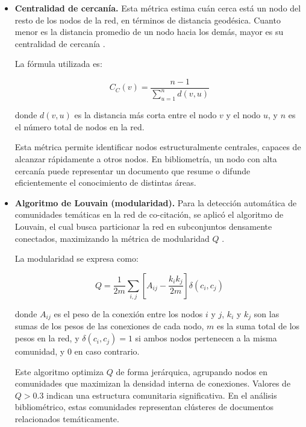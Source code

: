 \documentclass[twoside, twocolumn]{article}
\newcommand{\1}{\mathds{1}}						%
\begin{document}
\begin{enumerate}
\begin{itemize}
    donde $\sigma_{st}$ representa el número total de caminos más cortos entre los nodos $s$ y $t$, y $\sigma_{st}(v)$ es el número de esos caminos que pasan por el nodo $v$.

    Un valor elevado de $C_B$ señala a nodos que funcionan como puentes críticos entre comunidades o subredes. En bibliometría, este indicador permite identificar trabajos con un rol articulador o interdisciplinario, capaces de conectar áreas temáticas diferentes.

    \item \textbf{Centralidad de cercanía.} Esta métrica estima cuán cerca está un nodo del resto de los nodos de la red, en términos de distancia geodésica. Cuanto menor es la distancia promedio de un nodo hacia los demás, mayor es su centralidad de cercanía \cite{Bavelas1950}.

    La fórmula utilizada es:

    \begin{equation}
        C_C(v) = \frac{n - 1}{\sum_{u=1}^{n} d(v,u)}
    \end{equation}

    donde $d(v,u)$ es la distancia más corta entre el nodo $v$ y el nodo $u$, y $n$ es el número total de nodos en la red.

    Esta métrica permite identificar nodos estructuralmente centrales, capaces de alcanzar rápidamente a otros nodos. En bibliometría, un nodo con alta cercanía puede representar un documento que resume o difunde eficientemente el conocimiento de distintas áreas.

    \item \textbf{Algoritmo de Louvain (modularidad).} Para la detección automática de comunidades temáticas en la red de co-citación, se aplicó el algoritmo de Louvain, el cual busca particionar la red en subconjuntos densamente conectados, maximizando la métrica de modularidad $Q$ \cite{Blondel2008}.

    La modularidad se expresa como:

    \begin{equation}
        Q = \frac{1}{2m} \sum_{i,j} \left[ A_{ij} - \frac{k_i k_j}{2m} \right] \delta(c_i, c_j)
    \end{equation}

    donde $A_{ij}$ es el peso de la conexión entre los nodos $i$ y $j$, $k_i$ y $k_j$ son las sumas de los pesos de las conexiones de cada nodo, $m$ es la suma total de los pesos en la red, y $\delta(c_i, c_j) = 1$ si ambos nodos pertenecen a la misma comunidad, y 0 en caso contrario.

    Este algoritmo optimiza $Q$ de forma jerárquica, agrupando nodos en comunidades que maximizan la densidad interna de conexiones. Valores de $Q > 0.3$ indican una estructura comunitaria significativa. En el análisis bibliométrico, estas comunidades representan clústeres de documentos relacionados temáticamente.

\end{itemize}

\end{enumerate}
\end{document}
